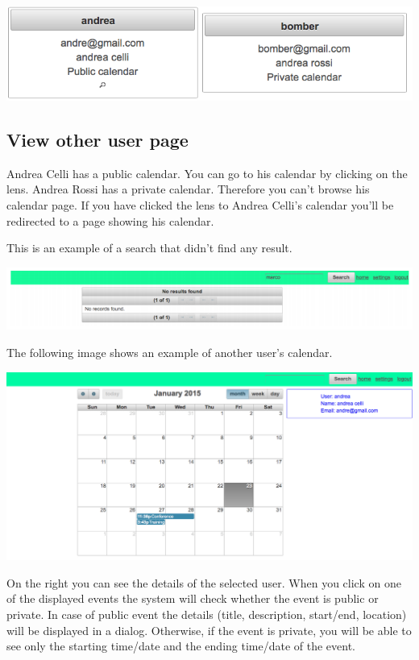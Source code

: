 \documentclass[10pt,a4paper,titlepage]{article}
\begin{document}
\begin{center}
\includegraphics[width=0.7\linewidth]{./images/20_search_results_detail}
\end{center}

\subsection{View other user page}
Andrea Celli has a public calendar. You can go to his calendar by clicking on the lens. Andrea Rossi has a private calendar. Therefore you can’t browse his calendar page. If you have clicked the lens to Andrea Celli’s calendar you’ll be redirected to a page showing his calendar.

This is an example of a search that didn’t find any result.

\begin{center}
\includegraphics[width=\linewidth]{./images/21_search_no_results}
\end{center}

The following image shows an example of another user’s calendar.

\begin{center}
\includegraphics[width=\linewidth]{./images/22_other_user_page}
\end{center}

On the right you can see the details of the selected user.
When you click on one of the displayed events the system will check whether the event is public or private.
In case of public event the details (title, description, start/end, location) will be displayed in a dialog.
Otherwise, if the event is private, you will be able to see only the starting time/date and the ending time/date of the event. 
\end{document}
